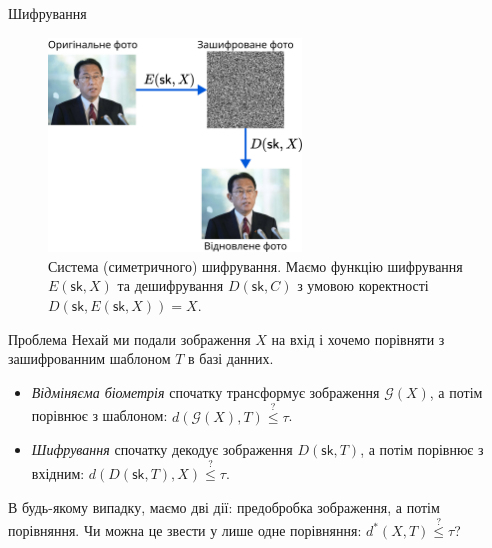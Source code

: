 \documentclass[xcolor={usenames,dvipsnames}]{beamer}
\begin{document}
    \begin{frame}{Шифрування}
        \begin{figure}
        \centering
            \includegraphics[width=0.6\textwidth]{images/cipher.png}
            \caption{Система (симетричного) шифрування. Маємо функцію шифрування $E(\mathsf{sk},X)$ та дешифрування $D(\mathsf{sk},C)$ з умовою коректності $D(\mathsf{sk},E(\mathsf{sk},X))=X$.}
        \end{figure}
    \end{frame}

    \begin{frame}{Проблема}
        Нехай ми подали зображення $X$ на вхід і хочемо порівняти з зашифрованним шаблоном $T$ в базі данних.
        \begin{itemize}
            \item \textit{Відміняєма біометрія} спочатку трансформує зображення $\mathcal{G}(X)$, а потім порівнює з шаблоном: $d(\mathcal{G}(X),T) \stackrel{?}{\leq} \tau$.
            \item \textit{Шифрування} спочатку декодує зображення $D(\mathsf{sk},T)$, а потім порівнює з вхідним: $d(D(\mathsf{sk},T),X) \stackrel{?}{\leq} \tau$.
        \end{itemize}
        В будь-якому випадку, маємо дві дії: предобробка зображення, а потім порівняння. Чи можна це звести у лише одне порівняння: $d^*(X,T) \stackrel{?}{\leq} \tau$?
    \end{frame}
\end{document}
